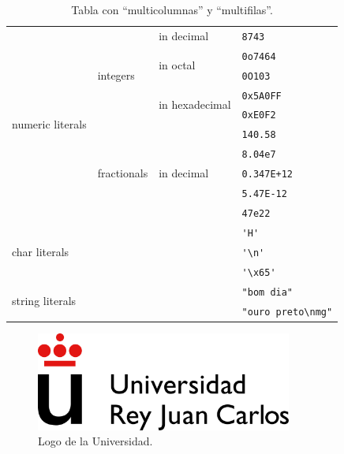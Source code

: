 \documentclass[twoside]{urjc-tfg}
\begin{document}
\begin{table}
  \centering

\begin{small}
\begin{tabular}{|l|l|l|l|}\hline
  \multirow{10}{*}{numeric literals} & \multirow{5}{*}{integers} & in decimal & \verb|8743| \\ \cline{3-4}
  & & \multirow{2}{*}{in octal} & \verb|0o7464| \\ \cline{4-4}
  & & & \verb|0O103| \\ \cline{3-4}
  & & \multirow{2}{*}{in hexadecimal} & \verb|0x5A0FF| \\ \cline{4-4}
  & & & \verb|0xE0F2| \\ \cline{2-4}
  & \multirow{5}{*}{fractionals} & \multirow{5}{*}{in decimal} & \verb|140.58| \\ \cline{4-4}
  & & & \verb|8.04e7| \\ \cline{4-4}
  & & & \verb|0.347E+12| \\ \cline{4-4}
  & & & \verb|5.47E-12| \\ \cline{4-4}
  & & & \verb|47e22| \\ \cline{1-4}
  \multicolumn{3}{|l|}{\multirow{3}{*}{char literals}} & \verb|'H'| \\ \cline{4-4}
  \multicolumn{3}{|l|}{} & \verb|'\n'| \\ \cline{4-4}          %
  \multicolumn{3}{|l|}{} & \verb|'\x65'| \\ \cline{1-4}        %
  \multicolumn{3}{|l|}{\multirow{2}{*}{string literals}} & \verb|"bom dia"| \\ \cline{4-4}
  \multicolumn{3}{|l|}{} & \verb|"ouro preto\nmg"| \\ \cline{1-4}          %
\end{tabular}
\end{small}

  \caption{Tabla con ``multicolumnas'' y ``multifilas''.}\label{tab:tablacompleja}
\end{table}





\begin{figure}
  \centering
  \includegraphics[width=0.75\textwidth,clip=true]{urjc-logo}
  \caption{Logo de la Universidad.}
  \label{fig:logo_universidad}
\end{figure}
\end{document}
